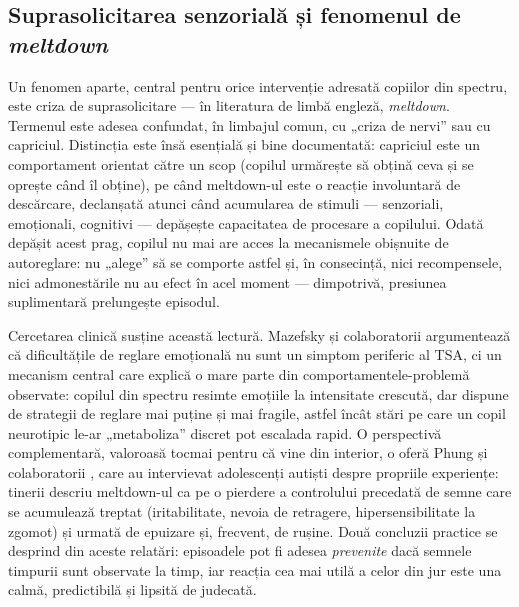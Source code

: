 \subsection{Suprasolicitarea senzorială și fenomenul de \emph{meltdown}}
\label{an:sec:meltdown}

Un fenomen aparte, central pentru orice intervenție adresată copiilor din spectru, este criza de suprasolicitare — în literatura de limbă engleză, \emph{meltdown}. Termenul este adesea confundat, în limbajul comun, cu „criza de nervi” sau cu capriciul. Distincția este însă esențială și bine documentată: capriciul este un comportament orientat către un scop (copilul urmărește să obțină ceva și se oprește când îl obține), pe când meltdown-ul este o reacție involuntară de descărcare, declanșată atunci când acumularea de stimuli — senzoriali, emoționali, cognitivi — depășește capacitatea de procesare a copilului. Odată depășit acest prag, copilul nu mai are acces la mecanismele obișnuite de autoreglare: nu „alege” să se comporte astfel și, în consecință, nici recompensele, nici admonestările nu au efect în acel moment — dimpotrivă, presiunea suplimentară prelungește episodul.

Cercetarea clinică susține această lectură. Mazefsky și colaboratorii \cite{mazefsky2013} argumentează că dificultățile de reglare emoțională nu sunt un simptom periferic al TSA, ci un mecanism central care explică o mare parte din comportamentele-problemă observate: copilul din spectru resimte emoțiile la intensitate crescută, dar dispune de strategii de reglare mai puține și mai fragile, astfel încât stări pe care un copil neurotipic le-ar „metaboliza” discret pot escalada rapid. O perspectivă complementară, valoroasă tocmai pentru că vine din interior, o oferă Phung și colaboratorii \cite{phung2021}, care au intervievat adolescenți autiști despre propriile experiențe: tinerii descriu meltdown-ul ca pe o pierdere a controlului precedată de semne care se acumulează treptat (iritabilitate, nevoia de retragere, hipersensibilitate la zgomot) și urmată de epuizare și, frecvent, de rușine. Două concluzii practice se desprind din aceste relatări: episoadele pot fi adesea \emph{prevenite} dacă semnele timpurii sunt observate la timp, iar reacția cea mai utilă a celor din jur este una calmă, predictibilă și lipsită de judecată.

